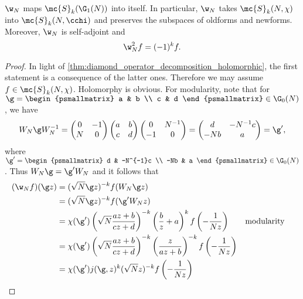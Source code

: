    \begin{proposition}\label{prop:Atkin_Lehner_holomorphic}
      $\w_{N}$ maps $\mc{S}_{k}(\G_{1}(N))$ into itself. In particular, $\w_{N}$ takes $\mc{S}_{k}(N,\chi)$ into $\mc{S}_{k}(N,\cchi)$ and preserves the subspaces of oldforms and newforms. Moreover, $\w_{N}$ is self-adjoint and
      \[
        \w_{N}^{2}f = (-1)^{k}f.
      \]
    \end{proposition}
    \begin{proof}
      In light of \cref{thm:diamond_operator_decomposition_holomorphic}, the first statement is a consequence of the latter ones. Therefore we may assume $f \in \mc{S}_{k}(N,\chi)$. Holomorphy is obvious. For modularity, note that for $\g = \begin{psmallmatrix} a & b \\ c & d \end{psmallmatrix} \in \G_{0}(N)$, we have
      \[
        W_{N}\g W_{N}^{-1} = \begin{pmatrix} 0 & -1 \\ N & 0 \end{pmatrix}\begin{pmatrix} a & b \\ c & d \end{pmatrix}\begin{pmatrix} 0 & N^{-1} \\ -1 & 0 \end{pmatrix} = \begin{pmatrix} d & -N^{-1}c \\ -Nb & a \end{pmatrix} = \g',
      \]
      where $\g' = \begin{psmallmatrix} d & -N^{-1}c \\ -Nb & a \end{psmallmatrix} \in \G_{0}(N)$. Thus $W_{N}\g = \g'W_{N}$ and it follows that
      \begin{align*}
        (\w_{N}f)(\g z) &= (\sqrt{N}\g z)^{-k}f(W_{N}\g z) \\
        &= (\sqrt{N}\g z)^{-k}f(\g'W_{N}z) \\
        &= \chi(\g')\left(\sqrt{N}\frac{az+b}{cz+d}\right)^{-k}\left(\frac{b}{z}+a\right)^{k}f\left(-\frac{1}{Nz}\right) && \text{modularity} \\
        &= \chi(\g')\left(\sqrt{N}\frac{az+b}{cz+d}\right)^{-k}\left(\frac{z}{az+b}\right)^{-k}f\left(-\frac{1}{Nz}\right) \\
        &= \chi(\g')j(\g,z)^{k}(\sqrt{N}z)^{-k}f\left(-\frac{1}{Nz}\right) \\

\end{align*}
\end{proof}

